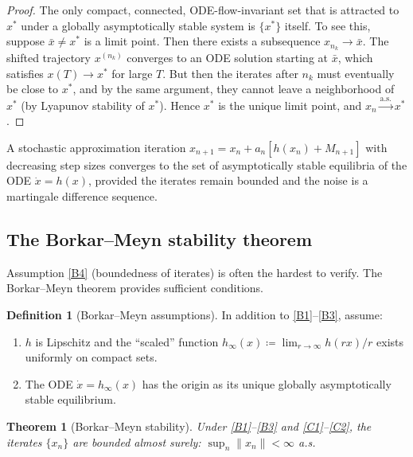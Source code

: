 \documentclass[11pt,a4paper]{article}
\theoremstyle{definition}
\newtheorem{definition}{Definition}[section]
\theoremstyle{plain}
\newtheorem{theorem}{Theorem}[section]
\theoremstyle{remark}
\newcommand{\cas}{\xrightarrow{\text{a.s.}}}
\begin{document}
\begin{proof}
The only compact, connected, ODE-flow-invariant set that is attracted to $x^*$ under
a globally asymptotically stable system is $\{x^*\}$ itself. To see this, suppose
$\bar{x} \neq x^*$ is a limit point. Then there exists a subsequence $x_{n_k} \to
\bar{x}$. The shifted trajectory $x^{(n_k)}$ converges to an ODE solution starting
at $\bar{x}$, which satisfies $x(T) \to x^*$ for large $T$. But then the iterates
after $n_k$ must eventually be close to $x^*$, and by the same argument, they
cannot leave a neighborhood of $x^*$ (by Lyapunov stability of $x^*$). Hence $x^*$
is the unique limit point, and $x_n \cas x^*$.
\end{proof}

\begin{keyresult}
A stochastic approximation iteration $x_{n+1} = x_n + a_n[h(x_n) + M_{n+1}]$
with decreasing step sizes converges to the set of asymptotically stable equilibria
of the ODE $\dot{x} = h(x)$, provided the iterates remain bounded and the noise is
a martingale difference sequence.
\end{keyresult}

\subsection{The Borkar--Meyn stability theorem}
\label{subsec:borkar-meyn}

Assumption \ref{B4} (boundedness of iterates) is often the hardest to verify. The
Borkar--Meyn theorem provides sufficient conditions.

\begin{definition}[Borkar--Meyn assumptions]
\label{def:borkar-meyn-assumptions}
In addition to \ref{B1}--\ref{B3}, assume:
\begin{enumerate}[label=(C\arabic*)]
\item \label{C1} $h$ is Lipschitz and the ``scaled'' function
  $h_\infty(x) \coloneqq \lim_{r \to \infty} h(rx)/r$ exists uniformly on compact
  sets.
\item \label{C2} The ODE $\dot{x} = h_\infty(x)$ has the origin as its unique
  globally asymptotically stable equilibrium.
\end{enumerate}
\end{definition}

\begin{theorem}[Borkar--Meyn stability]
\label{thm:borkar-meyn}
Under \ref{B1}--\ref{B3} and \ref{C1}--\ref{C2}, the iterates $\{x_n\}$ are bounded
almost surely: $\sup_n \|x_n\| < \infty$ a.s.
\end{theorem}
\end{document}
